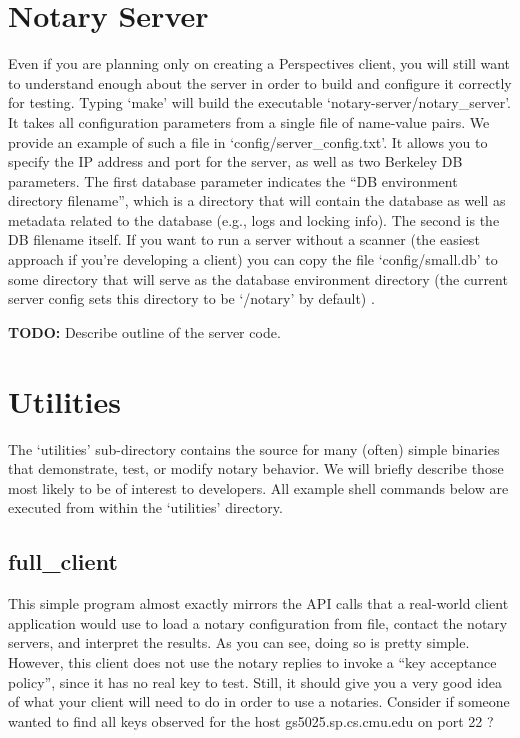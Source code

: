 \documentclass[pdftex,singlecolumn,11pt,letterpaper]{article}
\newcommand{\name}{Perspectives\xspace}
\begin{document}
\section{Notary Server}

Even if you are planning only on creating a \name client, you will still want
to understand enough about the server in order to build and configure it 
correctly for testing.  Typing `make' will build the executable 
`notary-server/notary\_server'.  It takes all configuration parameters from
a single file of name-value pairs.  We provide an example of such a file in
`config/server\_config.txt'.  It allows you to specify the IP address and port
for the server, as well as two Berkeley DB parameters.  The first database
parameter indicates the ``DB environment directory filename'', 
which is a directory
that will contain the database as well as metadata related to the database
(e.g., logs and locking info).  The second is the DB filename itself.
If you want to run a 
server without a scanner (the easiest approach if you're developing a client)
you can copy the file `config/small.db' to some directory that will serve
as the database environment directory (the current server config sets this
directory to be `/notary' by default) .  

\noindent\textbf{TODO:} Describe outline of the server code.   

\section{Utilities}

The `utilities' sub-directory contains the source for many (often) simple
binaries that demonstrate, test, or modify notary behavior.  We will
briefly describe those most likely to be of interest to developers.
All example shell commands below are executed from within the `utilities'
directory.  

\subsection{full\_client}

This simple program almost exactly mirrors the API calls that a real-world
client application would use to load a notary configuration from file, 
contact the notary servers, and interpret the results.  As you can see, 
doing so is pretty simple.  However, this client does not use the 
notary replies to invoke a ``key acceptance policy'', since it has no
real key to test.  Still, it should give you a very good idea of what
your client will need to do in order to use a notaries. Consider if someone
wanted to find all keys observed for the host gs5025.sp.cs.cmu.edu on port
22 ?\\ 
\end{document}
